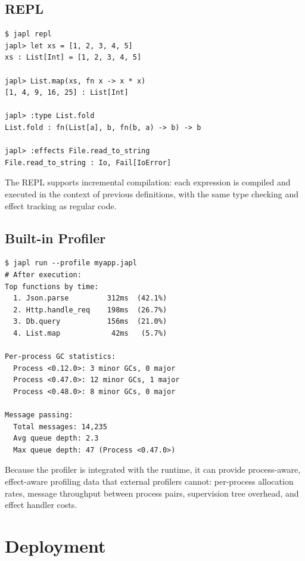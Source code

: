 \documentclass[11pt,twocolumn]{article}
\begin{document}
\subsection{REPL}

\begin{lstlisting}[language=shell]
$ japl repl
japl> let xs = [1, 2, 3, 4, 5]
xs : List[Int] = [1, 2, 3, 4, 5]

japl> List.map(xs, fn x -> x * x)
[1, 4, 9, 16, 25] : List[Int]

japl> :type List.fold
List.fold : fn(List[a], b, fn(b, a) -> b) -> b

japl> :effects File.read_to_string
File.read_to_string : Io, Fail[IoError]
\end{lstlisting}

The REPL supports incremental compilation: each expression is compiled and executed in the context of previous definitions, with the same type checking and effect tracking as regular code.

\subsection{Built-in Profiler}

\begin{lstlisting}[language=shell]
$ japl run --profile myapp.japl
# After execution:
Top functions by time:
  1. Json.parse         312ms  (42.1%)
  2. Http.handle_req    198ms  (26.7%)
  3. Db.query           156ms  (21.0%)
  4. List.map            42ms   (5.7%)

Per-process GC statistics:
  Process <0.12.0>: 3 minor GCs, 0 major
  Process <0.47.0>: 12 minor GCs, 1 major
  Process <0.48.0>: 8 minor GCs, 0 major

Message passing:
  Total messages: 14,235
  Avg queue depth: 2.3
  Max queue depth: 47 (Process <0.47.0>)
\end{lstlisting}

Because the profiler is integrated with the runtime, it can provide process-aware, effect-aware profiling data that external profilers cannot: per-process allocation rates, message throughput between process pairs, supervision tree overhead, and effect handler costs.

\section{Deployment}
\label{sec:deployment}
\end{document}
